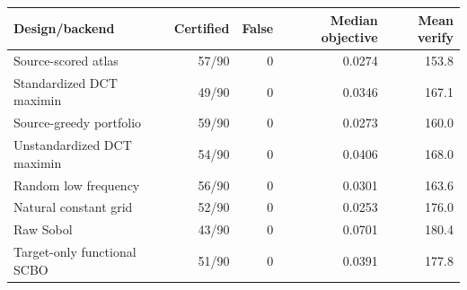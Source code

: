 \begin{tabular}{lrrrr}
\toprule
Design/backend & Certified & False & Median objective & Mean verify \\
\midrule
Source-scored atlas & 57/90 & 0 & 0.0274 & 153.8 \\
Standardized DCT maximin & 49/90 & 0 & 0.0346 & 167.1 \\
Source-greedy portfolio & 59/90 & 0 & 0.0273 & 160.0 \\
Unstandardized DCT maximin & 54/90 & 0 & 0.0406 & 168.0 \\
Random low frequency & 56/90 & 0 & 0.0301 & 163.6 \\
Natural constant grid & 52/90 & 0 & 0.0253 & 176.0 \\
Raw Sobol & 43/90 & 0 & 0.0701 & 180.4 \\
Target-only functional SCBO & 51/90 & 0 & 0.0391 & 177.8 \\
\bottomrule
\end{tabular}
